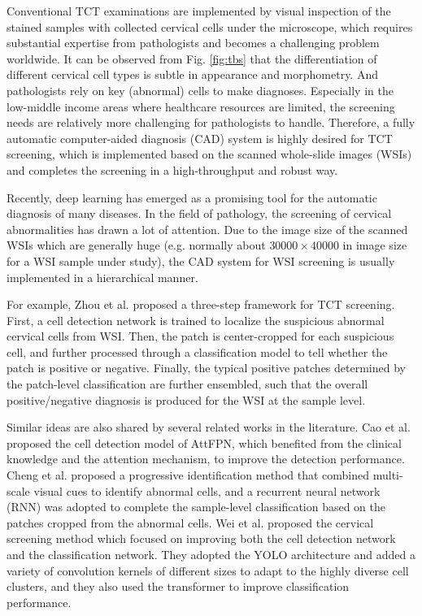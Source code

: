 Conventional TCT examinations are implemented by visual inspection of the stained samples with collected cervical cells under the microscope, which requires substantial expertise from pathologists and becomes a challenging problem worldwide. It can be observed from Fig. \ref{fig:tbs} that the differentiation of different cervical cell types is subtle in appearance and morphometry. And pathologists rely on key (abnormal) cells to make diagnoses. Especially in the low-middle income areas where healthcare resources are limited, the screening needs are relatively more challenging for pathologists to handle. Therefore, a fully automatic computer-aided diagnosis (CAD) system is highly desired for TCT screening, which is implemented based on the scanned whole-slide images (WSIs) and completes the screening in a high-throughput and robust way.




Recently, deep learning has emerged as a promising tool for the automatic diagnosis of many diseases. 
In the field of pathology, the screening of cervical abnormalities has drawn a lot of attention. Due to the image size of the scanned WSIs which are generally huge (e.g. normally about $30000\times 40000$ in image size for a WSI sample under study), the CAD system for WSI screening is usually implemented in a hierarchical manner. 



For example, Zhou et al. \cite{zhou2021hierarchical} proposed a three-step framework for TCT screening.
First, a cell detection network is trained to localize the suspicious abnormal cervical cells from WSI.
Then, the patch is center-cropped for each suspicious cell, and further processed through a classification model to tell whether the patch is positive or negative. 
Finally, the typical positive patches determined by the patch-level classification are further ensembled, such that the overall positive/negative diagnosis is produced for the WSI at the sample level. 

Similar ideas are also shared by several related works in the literature.
Cao et al. \cite{cao2021novel} proposed the cell detection model of AttFPN, which benefited from the clinical knowledge and the attention mechanism, to improve the detection performance. Cheng et al.
\cite{cheng2021robust} proposed a progressive identification method that combined multi-scale visual cues to identify abnormal cells, and a recurrent neural network (RNN) was adopted to complete the sample-level classification based on the patches cropped from the abnormal cells. Wei et al. \cite{wei2021efficient} proposed the cervical screening method which focused on improving both the cell detection network and the classification network. They adopted the YOLO architecture and added a variety of convolution kernels of different sizes to adapt to the highly diverse cell clusters, and they also used the transformer to improve classification performance.


